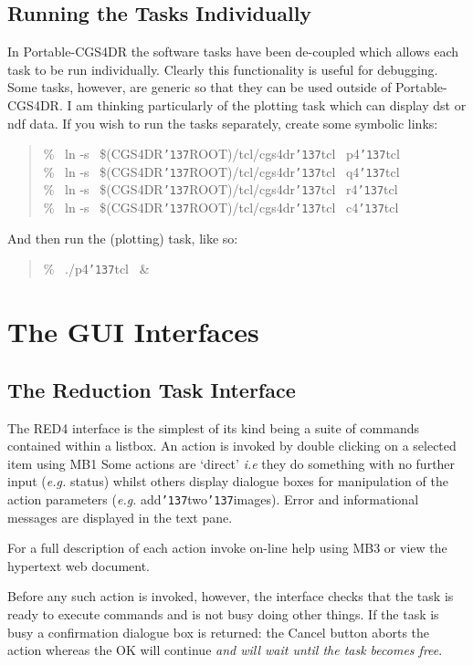 \documentclass[a4paper]{book}
\newcommand{\stardocinitials}  {SUN}
\newcommand{\stardocnumber}    {27.5}
\newcommand{\stardocname}{\stardocinitials /\stardocnumber}
\renewcommand{\_}{{\tt\char'137}}
\begin{document}
\section{Running the Tasks Individually}
In Portable-CGS4DR the software tasks have been de-coupled which allows each task to be
run individually. Clearly this functionality is useful for debugging. Some tasks, however,
are generic so that they can be used outside of Portable-CGS4DR. I am thinking particularly
of the plotting task which can display {\sc dst} or {\sc ndf} data. If you wish to run the
tasks separately, create some symbolic links:

\begin{quote}
  \% \ ln -s \ \$(CGS4DR\_ROOT)/tcl/cgs4dr\_tcl \ p4\_tcl \\
  \% \ ln -s \ \$(CGS4DR\_ROOT)/tcl/cgs4dr\_tcl \ q4\_tcl \\
  \% \ ln -s \ \$(CGS4DR\_ROOT)/tcl/cgs4dr\_tcl \ r4\_tcl \\
  \% \ ln -s \ \$(CGS4DR\_ROOT)/tcl/cgs4dr\_tcl \ c4\_tcl
\end{quote}

And then run the (plotting) task, like so:

\begin{quote}
  \% \ ./p4\_tcl \ \&
\end{quote}

\markboth{The GUI Interfaces}{\stardocname}
\chapter{The GUI Interfaces}
\section{The Reduction Task Interface}
The RED4 interface is the simplest of its kind being a suite of commands
contained within a listbox. An action is invoked by double clicking on a selected item using MB1
Some actions are `direct' {\em i.e} they do something with no further
input ({\em e.g.} status) whilst others display dialogue boxes for manipulation of the action
parameters ({\em e.g.} add\_two\_images). Error and informational messages are displayed in the text pane.

For a full description of each action invoke on-line help using MB3 or view the hypertext web document.

Before any such action is invoked, however, the interface checks that the task is
ready to execute commands and is not busy doing other things. If the task is busy a confirmation
dialogue box is returned: the {\sf Cancel} button aborts the action whereas the {\sf OK} will continue
{\em and will wait until the task becomes free}.
\end{document}
